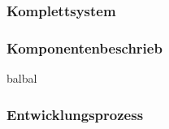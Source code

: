 \subsubsection{Komplettsystem}
\subsubsection*{Komponentenbeschrieb}

balbal

\subsubsection*{Entwicklungsprozess}